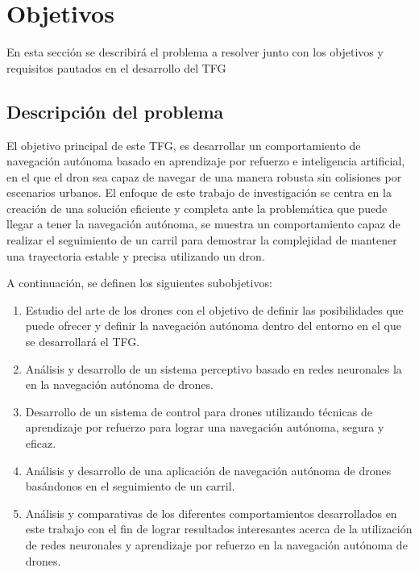 \chapter{Objetivos}
\label{cap:capitulo2}


En esta sección se describirá el problema a resolver junto con los objetivos y requisitos pautados en el desarrollo del TFG


\section{Descripción del problema}
\label{sec:descripcion}

El objetivo principal de este TFG, es desarrollar un comportamiento de navegación autónoma basado en 
aprendizaje por refuerzo e inteligencia artificial, en el que el dron sea capaz de navegar de una manera robusta sin colisiones por escenarios urbanos. El enfoque de este trabajo de investigación 
se centra en la creación de una solución eficiente y completa ante la problemática que puede llegar a tener la navegación autónoma, se 
muestra un comportamiento capaz de realizar el seguimiento de un carril para demostrar la complejidad de mantener una trayectoria estable 
y precisa utilizando un dron. 

A continuación, se definen los siguientes subobjetivos: 

\begin{enumerate}
    \item Estudio del arte de los drones con el objetivo de definir las posibilidades que puede ofrecer y definir 
    la navegación autónoma dentro del entorno en el que se desarrollará el TFG. 
    \item Análisis y desarrollo de un sistema perceptivo basado en redes neuronales la en la navegación autónoma de drones.
    \item Desarrollo  de un sistema de control para drones utilizando técnicas de aprendizaje por refuerzo para lograr una navegación 
    autónoma, segura y eficaz.
    \item Análisis y desarrollo de una aplicación de navegación autónoma de drones basándonos en el seguimiento de un carril.
    \item Análisis y comparativas de los diferentes comportamientos desarrollados en este trabajo con el fin de 
    lograr resultados interesantes acerca de la utilización de redes neuronales y aprendizaje por refuerzo en la navegación autónoma de drones.
\end{enumerate}
\newpage
